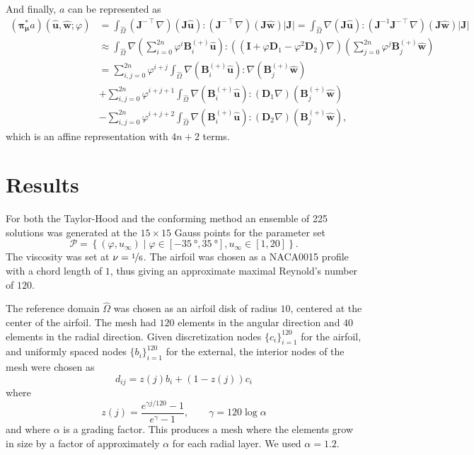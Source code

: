 \documentclass[onecolumn, twoside, a4paper, 11pt]{article}
\begin{document}
And finally, $a$ can be represented as
\begin{align}
  \nonumber
  ({\bm\pi}^*_{\bm\mu}a)(
    \hat{\bm u},
    \hat{\bm w};
    \varphi
  ) &= \int_{\hat{\Omega}}
      (\bm J^{-\intercal} \nabla) (\bm J \hat{\bm u}) :
      (\bm J^{-\intercal} \nabla) (\bm J \hat{\bm w}) |\bm J|
    = \int_{\hat{\Omega}}
      \nabla (\bm J \hat{\bm u}) :
      (\bm J^{-1} \bm J^{-\intercal} \nabla) (\bm J \hat{\bm w}) |\bm J| \\
  \nonumber
    &\approx \int_{\hat{\Omega}}
      \nabla \left( \sum_{i=0}^{2n} \varphi^i \bm B^{(+)}_i \hat{\bm u} \right) :
      ((\bm I + \varphi \bm D_1 - \varphi^2 \bm D_2) \nabla)
      \left( \sum_{j=0}^{2n} \varphi^j \bm B^{(+)}_j \hat{\bm w} \right) \\
  \nonumber
    &= \sum_{i,j=0}^{2n} \varphi^{i+j} \int_{\hat{\Omega}}
      \nabla (\bm B^{(+)}_i \hat{\bm u}) : \nabla (\bm B^{(+)}_j \hat{\bm w}) \\
  \nonumber
    &+ \sum_{i,j=0}^{2n} \varphi^{i+j+1} \int_{\hat{\Omega}}
      \nabla (\bm B^{(+)}_i \hat{\bm u}) : (\bm D_1 \nabla) (\bm B^{(+)}_j \hat{\bm w}) \\
    &- \sum_{i,j=0}^{2n} \varphi^{i+j+2} \int_{\hat{\Omega}}
      \nabla (\bm B^{(+)}_i \hat{\bm u}) : (\bm D_2 \nabla) (\bm B^{(+)}_j \hat{\bm w}),
\end{align}
which is an affine representation with $4n+2$ terms.

\section{Results}
\label{sec:results}

For both the Taylor-Hood and the conforming method an ensemble of 225 solutions was generated at
the $15 \times 15$ Gauss points for the parameter set
\[
  \mathcal{P} = \left\{ (\varphi,u_\infty) \;|\;
    \varphi \in [-\SI{35}{\degree},\SI{35}{\degree}],
    u_\infty \in [1, 20]
  \right\}.
\]
The viscosity was set at $\nu = \nicefrac{1}{6}$. The airfoil was chosen as a
NACA0015 profile with a chord length of $1$, thus giving an approximate maximal
Reynold's number of $120$.

The reference domain $\hat{\Omega}$ was chosen as an airfoil disk of radius $10$, centered at the
center of the airfoil. The mesh had $120$ elements in the angular direction and $40$ elements in the
radial direction. Given discretization nodes $\{c_i\}_{i=1}^{120}$ for the airfoil, and uniformly
spaced nodes $\{b_i\}_{i=1}^{120}$ for the external, the interior nodes of the mesh were
chosen as
\begin{equation}
  \label{eq:meshgen}
  d_{ij} = z(j) b_i + (1 - z(j)) c_i
\end{equation}
where
\[
  z(j) = \frac{e^{\gamma j / 120} - 1}{e^{\gamma} - 1}, \qquad
  \gamma = 120 \log{\alpha}
\]
and where $\alpha$ is a grading factor. This produces a mesh where the elements grow in size by a
factor of approximately $\alpha$ for each radial layer. We used $\alpha = 1.2$.
\end{document}
